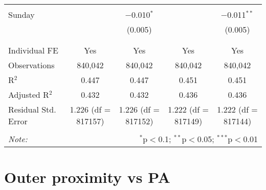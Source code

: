 \documentclass[
]{article}
\begin{document}
\begin{table}[!htbp]
{\begin{tabular}{@{\extracolsep{5pt}}lcccc}
  & & & & \\ 
 Sunday &  & $-$0.010$^{*}$ &  & $-$0.011$^{**}$ \\ 
  &  & (0.005) &  & (0.005) \\ 
  & & & & \\ 
\hline \\[-1.8ex] 
Individual FE & Yes & Yes & Yes & Yes \\ 
Observations & 840,042 & 840,042 & 840,042 & 840,042 \\ 
R$^{2}$ & 0.447 & 0.447 & 0.451 & 0.451 \\ 
Adjusted R$^{2}$ & 0.432 & 0.432 & 0.436 & 0.436 \\ 
Residual Std. Error & 1.226 (df = 817157) & 1.226 (df = 817152) & 1.222 (df = 817149) & 1.222 (df = 817144) \\ 
\hline 
\hline \\[-1.8ex] 
\textit{Note:}  & \multicolumn{4}{r}{$^{*}$p$<$0.1; $^{**}$p$<$0.05; $^{***}$p$<$0.01} \\ 
\end{tabular}
} 
\end{table} 
\newpage
\section{Outer proximity vs PA}
\end{document}
